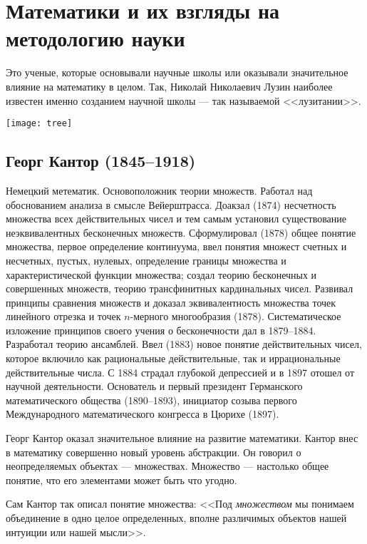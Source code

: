 \documentclass[a4paper,14pt]{extreport}
\begin{document}
\chapter{Математики и их взгляды на методологию науки}

Это ученые, которые основывали научные школы или оказывали значительное влияние на математику в целом. Так, Николай Николаевич Лузин наиболее известен именно созданием научной школы --- так называемой <<лузитании>>.

\vspace{.5cm}
\texttt{[image: tree]}

\section{Георг Кантор (1845--1918)}
\label{cantor}

Немецкий метематик. Основоположник теории множеств. Работал над обоснованием анализа в смысле Вейерштрасса. Доакзал (1874) несчетность множества всех действительных чисел и тем самым установил существование неэквивалентных бесконечных множеств. Сформулировал (1878) общее понятие множества, первое определение континуума, ввел понятия множест счетных и несчетных, пустых, нулевых, определение границы множества и характеристической функции множества; создал теорию бесконечных и совершенных множеств, теорию трансфинитных кардинальных чисел. Развивал принципы сравнения множеств и доказал эквивалентность множества точек линейного отрезка и точек $n$-мерного многообразия (1878). Систематическое изложение принципов своего учения о бесконечности дал в 1879--1884. Разработал теорию ансамблей. Ввел (1883) новое понятие действительных чисел, которое включило как рациональные действительные, так и иррациональные действительные числа. С 1884 страдал глубокой депрессией и в 1897 отошел от научной деятельности. Основатель и первый президент Германского математического общества (1890--1893), инициатор созыва первого Международного математического конгресса в Цюрихе (1897).
\cite{bogolubov}


Георг Кантор оказал значительное влияние на развитие математики.
Кантор внес в математику совершенно новый уровень абстракции.
Он говорил о неопределяемых объектах --- множествах. Множество --- настолько общее понятие, что его элементами может быть что угодно.


Сам Кантор так описал понятие множества: <<Под \textit{множеством} мы понимаем объединение в одно целое определенных, вполне различимых объектов нашей интуиции или нашей мысли>>.
\end{document}
